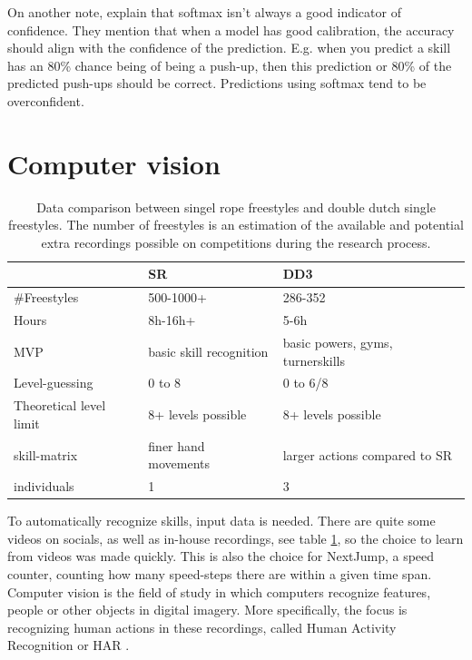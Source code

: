 On another note, \textcite{Guo_2017} explain that softmax isn't always a good indicator of confidence. They mention that when a model has good calibration, the accuracy should align with the confidence of the prediction. E.g. when you predict a skill has an 80\% chance being of being a push-up, then this prediction or 80\% of the predicted push-ups should be correct. Predictions using softmax tend to be overconfident.



\section{Computer vision}
\label{subsec:bp-literature-computer-vision}

\begin{table}[t]
    \centering
    \begin{tabular}{|l|l|l|}
        \hline
        & SR & DD3 \\ \hline
        \#Freestyles & 500-1000+ & 286-352 \\ \hline
        Hours & 8h-16h+ & 5-6h \\ \hline
        MVP & basic skill recognition & basic powers, gyms, turnerskills \\ \hline
        Level-guessing & 0 to 8 & 0 to 6/8 \\ \hline
        Theoretical level limit & 8+ levels possible & 8+ levels possible \\ \hline
        skill-matrix & finer hand movements & larger actions compared to SR \\ \hline
        individuals & 1 & 3 \\ \hline
    \end{tabular}
    \caption{Data comparison between singel rope freestyles and double dutch single freestyles. The number of freestyles is an estimation of the available and potential extra recordings possible on competitions during the research process.}
    \label{tbl:data-comparison-sr-dd}
\end{table}

To automatically recognize skills, input data is needed. There are quite some videos on socials, as well as in-house recordings, see table \ref{tbl:data-comparison-sr-dd}, so the choice to learn from videos was made quickly. This is also the choice for NextJump, a speed counter, counting how many speed-steps there are within a given time span.
Computer vision is the field of study in which computers recognize features, people or other objects in digital imagery. More specifically, the focus is recognizing human actions in these recordings, called Human Activity Recognition or HAR \autocite{Pareek_2020}.


